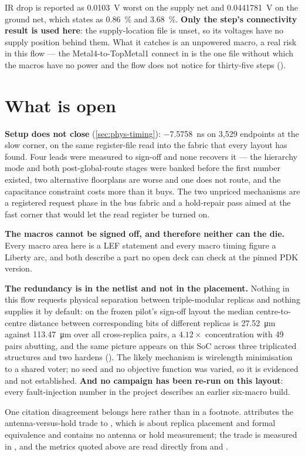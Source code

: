 IR drop is reported as \qty{0.0103}{\volt} worst on the supply net and
\qty{0.0441781}{\volt} on the ground net, which 
states as \qty{0.86}{\percent} and \qty{3.68}{\percent}. \textbf{Only
the step's connectivity result is used here}: the supply-location file
is unset, so its voltages have no supply position behind them. What it
catches is an unpowered macro, a real risk in this flow --- the
Metal4-to-TopMetal1 connect in  is the one file without which the macros have no power
and the flow does not notice for thirty-five steps
().

\section{What is open}

\textbf{Setup does not close} (\cref{sec:phys-timing}):
\qty{-7.5758}{\nano\second} on 3,529
endpoints at the slow corner, on the same register-file read into the
fabric that every layout has found. Four leads were measured to sign-off
and none recovers it --- the hierarchy mode and both post-global-route
stages were banked before the first number existed, two alternative
floorplans are worse and one does not route, and the capacitance
constraint costs more than it buys. The two unpriced mechanisms are a
registered request phase in the bus fabric and a hold-repair pass aimed
at the fast corner that would let the read register be turned on.

\textbf{The macros cannot be signed off, and therefore neither can the
die.} Every macro area here is a LEF  statement and every
macro timing figure a Liberty arc, and both describe a part no open deck
can check at the pinned PDK version.

\textbf{The redundancy is in the netlist and not in the placement.}
Nothing in this flow requests physical separation between
triple-modular replicas and nothing supplies it by default: on the
frozen pilot's sign-off layout the median centre-to-centre distance
between corresponding bits of different replicas is
\qty{27.52}{\micro\metre} against \qty{113.47}{\micro\metre} over all
cross-replica pairs, a $4.12\times$ concentration with 49 pairs
abutting, and the same picture appears on this SoC across three
triplicated structures and two hardens
(). The likely mechanism is wirelength
minimisation to a shared voter; no seed and no objective function was
varied, so it is evidenced and not established. \textbf{And no campaign
has been re-run on this layout}: every fault-injection number in the
project describes an earlier six-macro build.

One citation disagreement belongs here rather than in a footnote.
 attributes the antenna-versus-hold trade to
, which is about replica placement and formal equivalence
and contains no antenna or hold measurement; the trade is measured in
, and the metrics quoted above are read directly
from  and .
